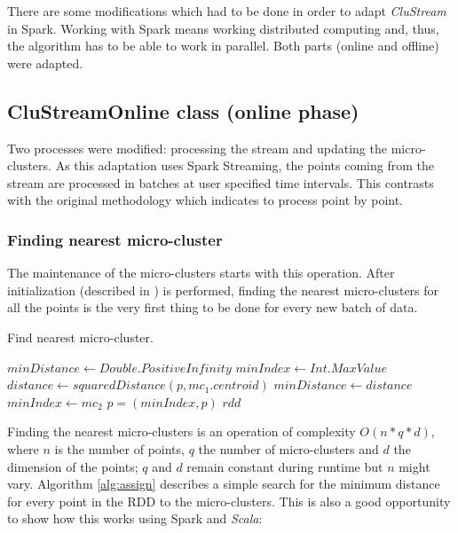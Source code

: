 There are some modifications which had to be done in order to adapt \textit{CluStream} in Spark. Working with Spark means working distributed computing and, thus, the algorithm has to be able to work in parallel. Both parts (online and offline) were adapted.

\subsection{CluStreamOnline class (online phase)}

Two processes were modified: processing the stream and updating the micro-clusters. As this adaptation uses Spark Streaming, the points coming from the stream are processed in batches at user specified time intervals. This contrasts with the original methodology which indicates to process point by point.

\subsubsection{Finding nearest micro-cluster}

The maintenance of the micro-clusters starts with this operation. After initialization (described in \cite{clustreamOrig}) is performed, finding the nearest micro-clusters for all the points is the very first thing to be done for every new batch of data.

\begin{algorithm}
 \caption{Find nearest micro-cluster.}\label{alg:assign}
 \begin{algorithmic}[1]
  \vspace{10pt}
  \State $minDistance \gets Double.PositiveInfinity$
  \State $minIndex \gets Int.MaxValue$
  \State $distance \gets squaredDistance(p, mc_1.centroid)$
  \State $minDistance \gets distance$
  \State $minIndex \gets mc_2$
  \EndIf
  \EndFor
  \State $p = (minIndex,p)$
  \EndFor
  \Return $rdd$
 \end{algorithmic}
\end{algorithm}

Finding the nearest micro-clusters is an operation of complexity $O(n*q*d)$, where $n$ is the number of points, $q$ the number of micro-clusters and $d$ the dimension of the points; $q$ and $d$ remain constant during runtime but $n$ might vary. Algorithm \ref{alg:assign} describes a simple search for the minimum distance for every point in the RDD to the micro-clusters. This is also a good opportunity to show how this works using Spark and \textit{Scala}:

